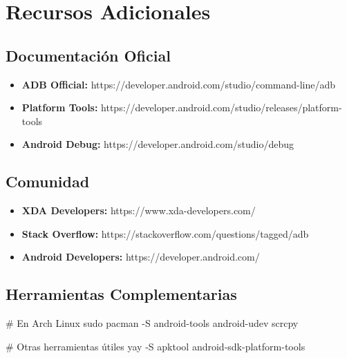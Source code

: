 \documentclass[
  doc,
  floatsintext,
  longtable,
  a4paper,
  nolmodern,
  notxfonts,
  notimes,
  12pt,
  colorlinks=true,linkcolor=blue,citecolor=blue,urlcolor=blue]{apa7}
\newenvironment{Shaded}{\begin{snugshade}}{\end{snugshade}}
\newcommand{\AttributeTok}[1]{\textcolor[rgb]{0.40,0.45,0.13}{#1}}
\newcommand{\CommentTok}[1]{\textcolor[rgb]{0.37,0.37,0.37}{#1}}
\newcommand{\ExtensionTok}[1]{\textcolor[rgb]{0.00,0.23,0.31}{#1}}
\newcommand{\FunctionTok}[1]{\textcolor[rgb]{0.28,0.35,0.67}{#1}}
\newcommand{\NormalTok}[1]{\textcolor[rgb]{0.00,0.23,0.31}{#1}}
\providecommand{\tightlist}{%
  \setlength{\itemsep}{0pt}\setlength{\parskip}{0pt}}
\begin{document}
\section{Recursos Adicionales}\label{recursos-adicionales}

\subsection{Documentación Oficial}\label{documentaciuxf3n-oficial}

\begin{itemize}
\tightlist
\item
  \textbf{ADB Official:}
  https://developer.android.com/studio/command-line/adb
\item
  \textbf{Platform Tools:}
  https://developer.android.com/studio/releases/platform-tools
\item
  \textbf{Android Debug:} https://developer.android.com/studio/debug
\end{itemize}

\subsection{Comunidad}\label{comunidad}

\begin{itemize}
\tightlist
\item
  \textbf{XDA Developers:} https://www.xda-developers.com/
\item
  \textbf{Stack Overflow:}
  https://stackoverflow.com/questions/tagged/adb
\item
  \textbf{Android Developers:} https://developer.android.com/
\end{itemize}

\subsection{Herramientas
Complementarias}\label{herramientas-complementarias}

\begin{Shaded}
\begin{Highlighting}[]
\CommentTok{\# En Arch Linux}
\FunctionTok{sudo}\NormalTok{ pacman }\AttributeTok{{-}S}\NormalTok{ android{-}tools android{-}udev scrcpy}

\CommentTok{\# Otras herramientas útiles}
\ExtensionTok{yay} \AttributeTok{{-}S}\NormalTok{ apktool android{-}sdk{-}platform{-}tools}
\end{Highlighting}
\end{Shaded}
\end{document}
